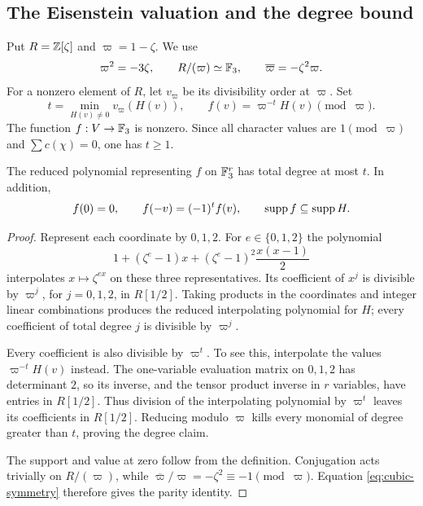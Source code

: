 \subsection{The Eisenstein valuation and the degree bound}

Put $R=\mathbb Z[\zeta]$ and $\varpi=1-\zeta$. We use
\[
 \varpi^2=-3\zeta,\qquad R/(\varpi)\simeq\mathbb F_3,
 \qquad\overline\varpi=-\zeta^2\varpi.
\]
For a nonzero element of $R$, let $v_{\varpi}$ be its divisibility order at
$\varpi$. Set
\[
 t=\min_{H(v)\ne0}v_{\varpi}(H(v)),\qquad
 f(v)=\varpi^{-t}H(v)\pmod\varpi.
\]
The function $f:V\to\mathbb F_3$ is nonzero. Since all character values are
$1\pmod\varpi$ and $\sum c(\chi)=0$, one has $t\geq1$.

\begin{lemma}
\label{lem:cubic-degree}
The reduced polynomial representing $f$ on $\mathbb F_3^r$ has total degree at most
$t$. In addition,
\begin{equation}\label{eq:cubic-fparity}
 f(0)=0,\qquad f(-v)=(-1)^t f(v),\qquad\operatorname{supp} f\subseteq\operatorname{supp} H.
\end{equation}
\end{lemma}

\begin{proof}
Represent each coordinate by $0,1,2$. For $e\in\{0,1,2\}$ the polynomial
\[
 1+(\zeta^e-1)x+(\zeta^e-1)^2\frac{x(x-1)}2
\]
interpolates $x\mapsto\zeta^{ex}$ on these three representatives. Its
coefficient of $x^j$ is divisible by $\varpi^j$, for $j=0,1,2$, in
$R[1/2]$. Taking products in the coordinates and integer linear
combinations produces the reduced interpolating polynomial for $H$;
every coefficient of total degree $j$ is divisible by $\varpi^j$.

Every coefficient is also divisible by $\varpi^t$. To see this, interpolate
the values $\varpi^{-t}H(v)$ instead. The one-variable evaluation matrix
on $0,1,2$ has determinant $2$, so its inverse, and the tensor product
inverse in $r$ variables, have entries in $R[1/2]$. Thus division of the
interpolating polynomial by $\varpi^t$ leaves its coefficients in
$R[1/2]$. Reducing modulo $\varpi$ kills every monomial of degree greater
than $t$, proving the degree claim.

The support and value at zero follow from the definition. Conjugation
acts trivially on $R/(\varpi)$, while
$\overline\varpi/\varpi=-\zeta^2\equiv-1\pmod\varpi$.
Equation \eqref{eq:cubic-symmetry} therefore gives the parity identity.
\end{proof}

